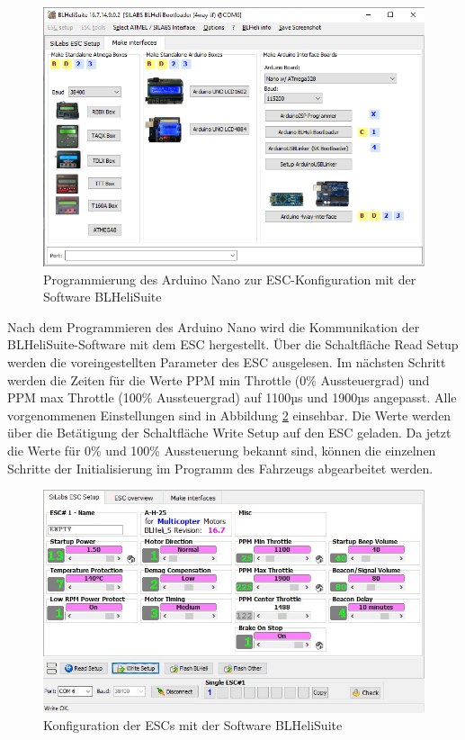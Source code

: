 \begin{figure}[H] %
\includegraphics[width=.78\textwidth]{sec4/images/Config_BLHeliSuite} 
\centering
\captionsetup{width=.95\textwidth}
\caption[Programmierung des Arduino Nano zur \ac{ESC}-Konfiguration]{Programmierung des Arduino Nano zur \ac{ESC}-Konfiguration mit der Software BLHeliSuite}\centering
\label{fig:ConfigBLHeliSuite}
\end{figure}

Nach dem Programmieren des Arduino Nano wird die Kommunikation der BLHeliSuite-Software mit dem \ac{ESC} hergestellt. Über die Schaltfläche \glqq{}Read Setup\grqq{} werden die voreingestellten Parameter des \ac{ESC} ausgelesen. Im nächsten Schritt werden die Zeiten für die Werte \glqq{}PPM min Throttle\grqq{} (0\% Aussteuergrad) und \glqq{}PPM max Throttle\grqq{} (100\% Aussteuergrad) auf 1100µs und 1900µs angepasst. Alle vorgenommenen Einstellungen sind in Abbildung \ref{fig:BLHeliSuite} einsehbar. Die Werte werden über die Betätigung der Schaltfläche \glqq{}Write Setup\grqq{} auf den \ac{ESC} geladen. Da jetzt die Werte für 0\% und 100\% Aussteuerung bekannt sind, können die einzelnen Schritte der Initialisierung im Programm des Fahrzeugs abgearbeitet werden.

\begin{figure}[H] %
\includegraphics[width=.78\textwidth]{sec4/images/ESC_config} 
\centering
\captionsetup{width=.95\textwidth}
\caption[Parameter der neuen \ac{ESC}-Konfiguration]{Konfiguration der \ac{ESC}s mit der Software \glqq{}BLHeliSuite\grqq{}}\centering
\label{fig:BLHeliSuite}
\end{figure}

